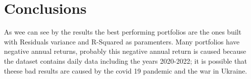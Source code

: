 \documentclass[12pt, a4paper, twocolumn]{article} %
\begin{document}
	\section{Conclusions}
	As wee can see by the results the best performing portfolios are the ones built with Residuals variance and R-Squared as paramenters. Many portfolios have negative annual returns, probably this negative annual return is caused because the dataset contains daily data including the years 2020-2022; it is possible that theese bad results are caused by the covid 19 pandemic and the war in Ukraine.
\nocite{*} %
\printbibliography[title={Bibliography}] %
\end{document}
